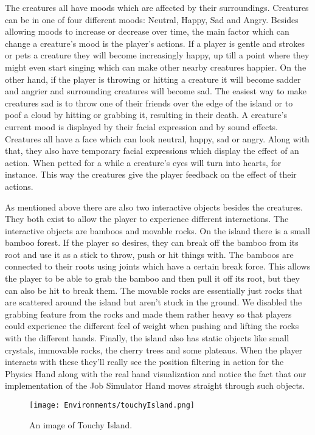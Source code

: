 The creatures all have moods which are affected by their surroundings. Creatures can be in one of four different moods: Neutral, Happy, Sad and Angry. Besides allowing moods to increase or decrease over time, the main factor which can change a creature's mood is the player's actions. If a player is gentle and strokes or pets a creature they will become increasingly happy, up till a point where they might even start singing which can make other nearby creatures happier. On the other hand, if the player is throwing or hitting a creature it will become sadder and angrier and surrounding creatures will become sad. The easiest way to make creatures sad is to throw one of their friends over the edge of the island or to poof a cloud by hitting or grabbing it, resulting in their death. A creature's current mood is displayed by their facial expression and by sound effects. Creatures all have a face which can look neutral, happy, sad or angry. Along with that, they also have temporary facial expressions which display the effect of an action. When petted for a while a creature's eyes will turn into hearts, for instance. This way the creatures give the player feedback on the effect of their actions.

As mentioned above there are also two interactive objects besides the creatures. They both exist to allow the player to experience different interactions. The interactive objects are bamboos and movable rocks. On the island there is a small bamboo forest. If the player so desires, they can break off the bamboo from its root and use it as a stick to throw, push or hit things with. The bamboos are connected to their roots using joints which have a certain break force. This allows the player to be able to grab the bamboo and then pull it off its root, but they can also be hit to break them. The movable rocks are essentially just rocks that are scattered around the island but aren't stuck in the ground. We disabled the grabbing feature from the rocks and made them rather heavy so that players could experience the different feel of weight when pushing and lifting the rocks with the different hands. Finally, the island also has static objects like small crystals, immovable rocks, the cherry trees and some plateaus. When the player interacts with these they'll really see the position filtering in action for the Physics Hand along with the real hand visualization and notice the fact that our implementation of the Job Simulator Hand moves straight through such objects. 

\begin{figure}[h]
\centering
\texttt{[image: Environments/touchyIsland.png]}
\caption{An image of Touchy Island.}
\label{fig:touchyIsland}
\end{figure}


